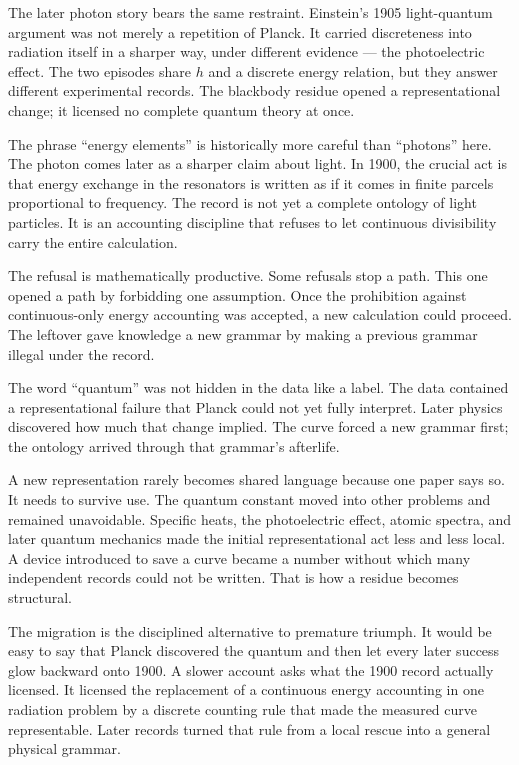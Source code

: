 The later photon story bears the same restraint. Einstein's 1905
light-quantum argument was not merely a repetition of Planck. It carried
discreteness into radiation itself in a sharper way, under different
evidence --- the photoelectric effect. The two episodes share $h$ and a discrete energy relation, but they
answer different experimental records. The blackbody residue opened a representational
change; it licensed no complete quantum theory at once.

The phrase ``energy elements'' is historically more careful than ``photons''
here. The photon comes later as a sharper claim about light. In 1900, the
crucial act is that energy exchange in the resonators is written as if it
comes in finite parcels proportional to frequency. The record is not yet
a complete ontology of light particles. It is an accounting discipline
that refuses to let continuous divisibility carry the entire calculation.

The refusal is mathematically productive. Some refusals stop a path. This
one opened a path by forbidding one assumption. Once the prohibition
against continuous-only energy accounting was accepted, a new calculation
could proceed. The leftover gave knowledge a new grammar by making a
previous grammar illegal under the record.

The word ``quantum'' was not hidden in the data like a label. The data
contained a representational failure that Planck could not yet fully
interpret. Later physics discovered how much that change implied. The
curve forced a new grammar first; the ontology arrived through that
grammar's afterlife.

A new representation rarely becomes shared language because one paper says
so. It needs to survive use. The quantum constant moved into other
problems and remained unavoidable. Specific heats, the photoelectric
effect, atomic spectra, and later quantum mechanics made the initial
representational act less and less local. A device introduced to save a
curve became a number without which many independent records could not be
written. That is how a residue becomes structural.

The migration is the disciplined alternative to premature triumph. It
would be easy to say that Planck discovered the quantum and then let every
later success glow backward onto 1900. A slower account asks what the 1900
record actually licensed. It licensed the replacement of a continuous
energy accounting in one radiation problem by a discrete counting rule
that made the measured curve representable. Later records turned that rule
from a local rescue into a general physical grammar.

